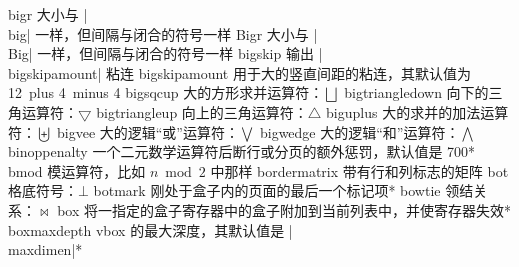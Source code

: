\capcs bigr {大小与 |\\big| 一样，但间隔与闭合的符号一样}{}{}%
\capcs Bigr {大小与 |\\Big| 一样，但间隔与闭合的符号一样}{}{}%
\capcs bigskip {输出 |\\bigskipamount| 粘连}{}{}
\capcs bigskipamount {用于大的竖直间距的粘连，其默认值为 12\pt\ plus 4\pt\ minus 4\pt}{}{}
\capcs bigsqcup {大的方形求并运算符：$\bigsqcup$}{}{}%
\capcs bigtriangledown {向下的三角运算符：$\bigtriangledown$}{}{}
\capcs bigtriangleup {向上的三角运算符：$\bigtriangleup$}{}{}
\capcs biguplus {大的求并的加法运算符：$\biguplus$}{}{}
\capcs bigvee {大的逻辑“或”运算符：$\bigvee$}{}{}
\capcs bigwedge {大的逻辑“和”运算符：$\bigwedge$}{}{}
\capcs binoppenalty {一个二元数学运算符后断行或分页的额外惩罚，默认值是 700}*{}
\capcs bmod {模运算符，比如 $n \bmod 2$ 中那样}{}{}
\capcs bordermatrix {带有行和列标志的矩阵}{}{}
\capcs bot {格底符号：$\bot$}{}{}%
\capcs botmark {刚处于盒子内的页面的最后一个标记项}*{}%
\capcs bowtie {领结关系：$\bowtie$}{}{}%
\capcs box {将一指定的盒子寄存器中的盒子附加到当前列表中，并使寄存器失效}*{}
\capcs boxmaxdepth {vbox 的最大深度，其默认值是 |\\maxdimen|}*{}
